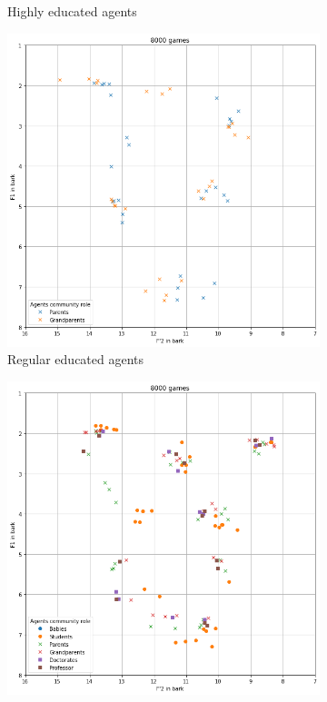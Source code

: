 \begin{figure}[ht]
\begin{subfigure}{.30\textwidth}
        \captionsetup{width=0.9\linewidth}
        \captionsetup{justification=centering}
        \caption{Highly educated agents}
    \end{subfigure}
    \hspace{0.5cm}
    \begin{subfigure}{.30\textwidth}
        \centering
        \includegraphics[width=\textwidth]{images/results/dual_regular.png}
        \captionsetup{width=0.9\linewidth}
        \captionsetup{justification=centering}
        \caption{Regular educated agents}
    \end{subfigure}
    \begin{subfigure}{.30\textwidth}
        \centering
        \includegraphics[width=\textwidth]{images/results/singla_all.png}

\end{subfigure}
\end{figure}
